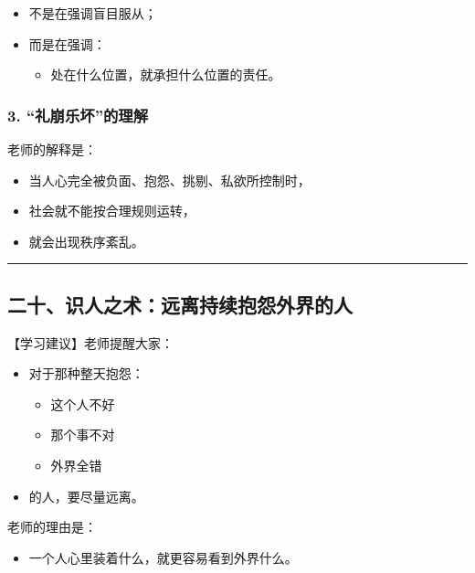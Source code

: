 \documentclass[
  chinese,
  9pt,
  a4paper,
]{ctexart}
\providecommand{\tightlist}{%
  \setlength{\itemsep}{0pt}\setlength{\parskip}{0pt}}
\begin{document}
\begin{itemize}
\item
  不是在强调盲目服从；
\item
  而是在强调：

  \begin{itemize}
  \tightlist
  \item
    处在什么位置，就承担什么位置的责任。
  \end{itemize}
\end{itemize}

\subsubsection{3.
``礼崩乐坏''的理解}\label{ux793cux5d29ux4e50ux574fux7684ux7406ux89e3}

老师的解释是：

\begin{itemize}
\tightlist
\item
  当人心完全被负面、抱怨、挑剔、私欲所控制时，
\item
  社会就不能按合理规则运转，
\item
  就会出现秩序紊乱。
\end{itemize}

\begin{center}\rule{0.5\linewidth}{0.5pt}\end{center}

\subsection{二十、识人之术：远离持续抱怨外界的人}\label{ux4e8cux5341ux8bc6ux4ebaux4e4bux672fux8fdcux79bbux6301ux7eedux62b1ux6028ux5916ux754cux7684ux4eba}

【学习建议】老师提醒大家：

\begin{itemize}
\item
  对于那种整天抱怨：

  \begin{itemize}
  \tightlist
  \item
    这个人不好
  \item
    那个事不对
  \item
    外界全错
  \end{itemize}
\item
  的人，要尽量远离。
\end{itemize}

老师的理由是：

\begin{itemize}
\tightlist
\item
  一个人心里装着什么，就更容易看到外界什么。
\end{itemize}
\end{document}
